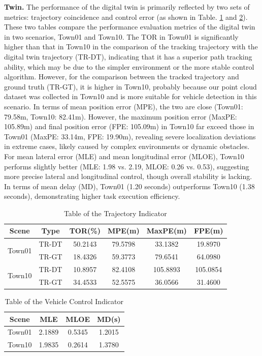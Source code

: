 \documentclass[lettersize,journal]{IEEEtran}
\begin{document}
\textbf{Twin.}
The performance of the digital twin is primarily reflected by two sets of metrics: trajectory coincidence and control error (as shown in Table. \ref{tab:3} and \ref{tab:4}). 
These two tables compare the performance evaluation metrics of the digital twin in two scenarios, Town01 and Town10. 
The TOR in Town01 is significantly higher than that in Town10 in the comparison of the tracking trajectory with the digital twin trajectory (TR-DT), indicating that it has a superior path tracking ability, which may be due to the simpler environment or the more stable control algorithm.
However, for the comparison between the tracked trajectory and ground truth (TR-GT), it is higher in Town10, probably because our point cloud dataset was collected in Town10 and is more suitable for vehicle detection in this scenario.
In terms of mean position error (MPE), the two are close (Town01: 79.58m, Town10: 82.41m). 
However, the maximum position error (MaxPE: 105.89m) and final position error (FPE: 105.09m) in Town10 far exceed those in Town01 (MaxPE: 33.14m, FPE: 19.90m), revealing severe localization deviations in extreme cases, likely caused by complex environments or dynamic obstacles. 
For mean lateral error (MLE) and mean longitudinal error (MLOE), Town10 performs slightly better (MLE: 1.98 vs. 2.19, MLOE: 0.26 vs. 0.53), suggesting more precise lateral and longitudinal control, though overall stability is lacking. 
In terms of mean delay (MD), Town01 (1.20 seconds) outperforms Town10 (1.38 seconds), demonstrating higher task execution efficiency.


\begin{table}[t]
	\centering
	\caption{Table of the Trajectory Indicator}
	\label{tab:3}
	\begin{tabular}{|c|c|c|c|c|c|}
		\hline
		Scene & Type & TOR(\%) & MPE(m) & MaxPE(m) & FPE(m) \\
		\hline
		\multirow{2}{*}{Town01} & TR-DT & 50.2143 & 79.5798 & 33.1382 & 19.8970 \\
		\cline{2-6}
		& TR-GT & 18.4326 & 59.3773 & 79.6541 & 64.0980 \\
		\hline
		\multirow{2}{*}{Town10} & TR-DT & 10.8957 & 82.4108 & 105.8893 & 105.0854 \\
		\cline{2-6}
		& TR-GT & 34.4533 & 52.5575 & 36.0566 & 31.4600 \\
		\hline
	\end{tabular}
\end{table}

\begin{table}[t]
	\centering
	\caption{Table of the Vehicle Control Indicator}
	\label{tab:4}
	\begin{tabular}{|c|c|c|c|}
		\hline
		\multicolumn{1}{|c|}{Scene} & \multicolumn{1}{c|}{MLE} & \multicolumn{1}{c|}{MLOE} & \multicolumn{1}{c|}{MD(s)} \\
		\hline
		Town01 & 2.1889 & 0.5345 & 1.2015 \\
		\hline
		Town10 & 1.9835 & 0.2614 & 1.3780 \\
		\hline
	\end{tabular}
\end{table}
\end{document}

